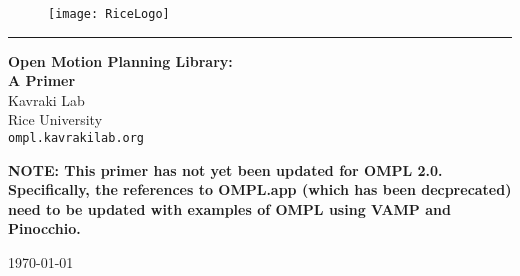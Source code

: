 \begin{titlepage}

\begin{center}



\begin {figure}
\centering
\texttt{[image: RiceLogo]}
\end{figure}
\vspace {0.25in}
\rule{\linewidth}{0.1mm}
\vspace {0.25in}

{ \huge \bfseries Open Motion Planning Library:\\ A Primer}
\\ [0.50in]
{\Large Kavraki Lab\\
Rice University
}
\\ [0.1in]
{\tt ompl.kavrakilab.org}

\vfill
\textbf{NOTE: This primer has not yet been updated for OMPL 2.0. Specifically, the references to OMPL.app (which has been decprecated) need to be updated with examples of OMPL using VAMP and Pinocchio.}

\vfill

{\large \today}

\end{center}

\end{titlepage}

